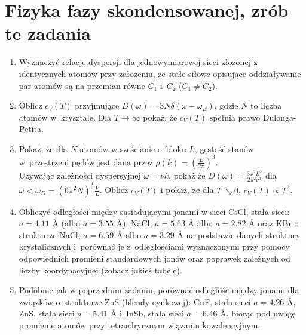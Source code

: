 \documentclass[a4paper,11pt]{article}
\begin{document}
\section{Fizyka fazy skondensowanej, zrób te zadania}





\begin{enumerate}

\item Wyznaczyć relacje dyspersji dla jednowymiarowej sieci złożonej z
  identycznych atomów przy założeniu, że stałe siłowe opisujące
  oddziaływanie par atomów są na przemian równe $C_{ 1 }$ i~$C_{ 2 }$
  ($C_{ 1 } \neq C_{ 2 }$).

\item Oblicz $c_{ V }( T )$ przyjmujące
  $D( \omega ) = 3 N \delta( \omega - \omega_{ E } )$, gdzie $N$ to
  liczba atomów w~krysztale. Dla $T \to \infty$ pokaż, że
  $c_{ V }( T )$ spełnia prawo Dulonga-Petita.

\item Pokaż, że dla $N$ atomów w sześcianie o~bloku $L$, gęstość stanów w~przestrzeni pędów jest dana przez $\rho( k ) = \left( \frac{ L }{ 2\pi } \right)^{ 3 }$. \\
  Używając zależności dyspersyjnej $\omega = \nu k$, pokaż że
  $D( \omega ) = \frac{ 3 \omega^{ 2 } L^{ 3 } }{ 2\pi^{ 2 } \nu^{ 3 }
  }$ dla
  $\omega < \omega_{ D } = ( 6 \pi^{ 2 } N )^{ \frac{ 1 }{ 3 } }
  \frac{ V }{ L }$. Oblicz $c_{ V }( T )$ i pokaż, że dla
  $T \searrow 0$, $c_{ V }( T ) \propto T^{ 3 }$.
\item Obliczyć odległości między sąsiadującymi jonami w sieci CsCl,
  stała sieci: $a = 4.11$ \AA{} (albo $a = 3.55$ \AA), NaCl,
  $a = 5.63$ \AA{} albo $a = 2.82$ \AA{} oraz KBr o strukturze NaCl,
  $a = 6.59$ \AA{} albo $a = 3.29$ \AA{} na podstawie danych struktury
  krystalicznych i~porównać je z~odległościami wyznaczonymi przy
  pomocy odpowiednich promieni standardowych jonów oraz poprawek
  zależnych od liczby koordynacyjnej (zobacz jakieś tabele).

\item Podobnie jak w poprzednim zadaniu, porównać odległość między
  jonami dla związków o~strukturze ZnS (blendy cynkowej): CuF, stała
  sieci $a = 4.26$ \AA, ZnS, stała sieci $a = 5.41$ \AA{} i~InSb,
  stała sieci $a = 6.46$ \AA, biorąc pod uwagę promienie atomów przy
  tetraedrycznym wiązaniu kowalencyjnym.


\end{enumerate}
\end{document}
